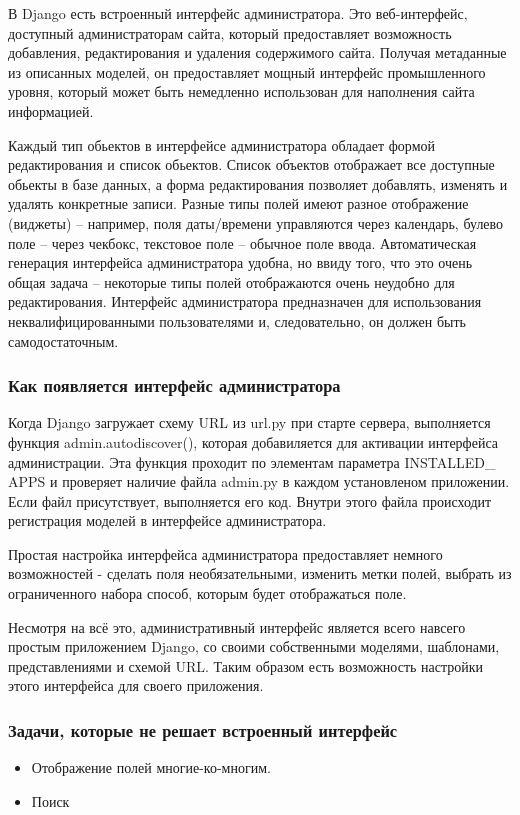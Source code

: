 \documentclass[a4paper]{report}
\begin{document}
В Django есть встроенный интерфейс администратора. Это веб-интерфейс, доступный администраторам сайта, который предоставляет возможность добавления, редактирования и удаления содержимого сайта. Получая метаданные из описанных моделей, он предоставляет мощный интерфейс промышленного уровня, который может быть немедленно использован для наполнения сайта информацией.

Каждый тип обьектов в интерфейсе администратора обладает формой редактирования и список обьектов. Список объектов отображает все доступные обьекты в базе данных, а форма редактирования позволяет добавлять, изменять и удалять конкретные записи. 
Разные типы полей имеют разное отображение (виджеты) -- например, поля даты/времени управляются через календарь, булево поле -- через чекбокс, текстовое поле -- обычное поле ввода. 
Автоматическая генерация интерфейса администратора удобна, но ввиду того, что это очень общая задача -- некоторые типы полей отображаются очень неудобно для редактирования. Интерфейс администратора предназначен для использования неквалифицированными пользователями и, следовательно, он должен быть самодостаточным.

\subsubsection{Как появляется интерфейс администратора}

Когда Django загружает схему URL из url.py  при старте сервера, выполняется функция admin.autodiscover(), которая добавиляется для активации интерфейса администрации. Эта функция проходит по элементам параметра INSTALLED\_ APPS и проверяет наличие файла admin.py в каждом установленом приложении. Если файл присутствует, выполняется его код. Внутри этого файла происходит регистрация моделей в интерфейсе администратора. %

Простая настройка интерфейса администратора предоставляет немного возможностей - сделать поля необязательными, изменить метки полей, выбрать из ограниченного набора способ, которым будет отображаться поле.

Несмотря на всё это, административный интерфейс является всего навсего простым приложением Django, со своими собственными моделями, шаблонами, представлениями и схемой URL. Таким образом есть возможность настройки этого интерфейса для своего приложения.

\subsubsection{Задачи, которые не решает встроенный интерфейс}
\begin{itemize}
	\item Отображение полей многие-ко-многим.
	\item Поиск
\end{itemize}
\end{document}
